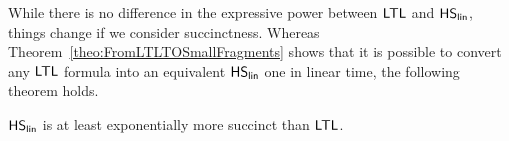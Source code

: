
While there is no difference in the expressive power between $\text{\sffamily LTL}$ and $\text{\sffamily HS}_{\mathsf{lin}}$, things change if we consider succinctness. Whereas Theorem~\ref{theo:FromLTLTOSmallFragments} shows that it is possible to convert any $\text{\sffamily LTL}$ formula into an equivalent $\text{\sffamily HS}_{\mathsf{lin}}$ one in linear time, the following theorem holds. 

\begin{theorem}\label{theo:succinctnessHSlin} $\text{\sffamily HS}_{\mathsf{lin}}$ is at least exponentially more succinct than $\text{\sffamily LTL}$.
\end{theorem}
